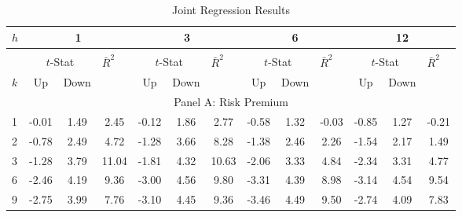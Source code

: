 \documentclass[11pt]{article}
\begin{document}
\clearpage
\newpage


\begin{table}
  \caption{Joint Regression Results}\label{TabOverLappingJointRegressionResults}
  \begin{center}\footnotesize
  \begin{tabular}{lllllllllllll}
\hline
$h$ & \multicolumn{3}{c}{1} & \multicolumn{3}{c}{3} & \multicolumn{3}{c}{6} & \multicolumn{3}{c}{12} \\
\hline
& \multicolumn{8}{c}{} \\
 & \multicolumn{2}{c}{$t$-Stat} & $\bar{R}^2$ & \multicolumn{2}{c}{$t$-Stat} & $\bar{R}^2$ & \multicolumn{2}{c}{$t$-Stat} & $\bar{R}^2$ & \multicolumn{2}{c}{$t$-Stat} & $\bar{R}^2$ \\
\hline
$k$ & \multicolumn{1}{c}{Up} & Down &  & \multicolumn{1}{c}{Up} & Down &  & \multicolumn{1}{c}{Up} & Down &  & \multicolumn{1}{c}{Up} & Down &  \\
\hline
\multicolumn{13}{c}{Panel A: Risk Premium} \\
\hline
1 & \multicolumn{1}{c}{-0.01} & \multicolumn{1}{c}{1.49} & \multicolumn{1}{c}{2.45} & \multicolumn{1}{c}{-0.12} & \multicolumn{1}{c}{1.86} & \multicolumn{1}{c}{2.77} & \multicolumn{1}{c}{-0.58} & \multicolumn{1}{c}{1.32} & \multicolumn{1}{c}{-0.03} & \multicolumn{1}{c}{-0.85} & \multicolumn{1}{c}{1.27} & \multicolumn{1}{c}{-0.21} \\
2 & \multicolumn{1}{c}{-0.78} & \multicolumn{1}{c}{2.49} & \multicolumn{1}{c}{4.72} & \multicolumn{1}{c}{-1.28} & \multicolumn{1}{c}{3.66} & \multicolumn{1}{c}{8.28} & \multicolumn{1}{c}{-1.38} & \multicolumn{1}{c}{2.46} & \multicolumn{1}{c}{2.26} & \multicolumn{1}{c}{-1.54} & \multicolumn{1}{c}{2.17} & \multicolumn{1}{c}{1.49} \\
3 & \multicolumn{1}{c}{-1.28} & \multicolumn{1}{c}{3.79} & \multicolumn{1}{c}{11.04} & \multicolumn{1}{c}{-1.81} & \multicolumn{1}{c}{4.32} & \multicolumn{1}{c}{10.63} & \multicolumn{1}{c}{-2.06} & \multicolumn{1}{c}{3.33} & \multicolumn{1}{c}{4.84} & \multicolumn{1}{c}{-2.34} & \multicolumn{1}{c}{3.31} & \multicolumn{1}{c}{4.77} \\
6 & \multicolumn{1}{c}{-2.46} & \multicolumn{1}{c}{4.19} & \multicolumn{1}{c}{9.36} & \multicolumn{1}{c}{-3.00} & \multicolumn{1}{c}{4.56} & \multicolumn{1}{c}{9.80} & \multicolumn{1}{c}{-3.31} & \multicolumn{1}{c}{4.39} & \multicolumn{1}{c}{8.98} & \multicolumn{1}{c}{-3.14} & \multicolumn{1}{c}{4.54} & \multicolumn{1}{c}{9.54} \\
9 & \multicolumn{1}{c}{-2.75} & \multicolumn{1}{c}{3.99} & \multicolumn{1}{c}{7.76} & \multicolumn{1}{c}{-3.10} & \multicolumn{1}{c}{4.45} & \multicolumn{1}{c}{9.36} & \multicolumn{1}{c}{-3.46} & \multicolumn{1}{c}{4.49} & \multicolumn{1}{c}{9.50} & \multicolumn{1}{c}{-2.74} & \multicolumn{1}{c}{4.09} & \multicolumn{1}{c}{7.83} \\

\end{tabular}
\end{center}
\end{table}
\end{document}
